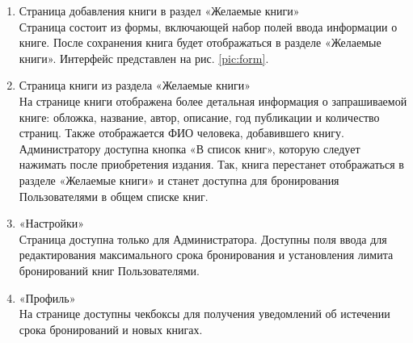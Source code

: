 \documentclass[project.tex]{subfiles}
\begin{document}
\begin{enumerate}
    \item Страница добавления книги в раздел «Желаемые книги»\\
    Страница состоит из формы, включающей набор полей ввода информации о книге. После сохранения книга будет отображаться в разделе «Желаемые книги». Интерфейс представлен на рис. \ref{pic:form}.
    \item Страница книги из раздела «Желаемые книги»\\
    На странице книги отображена более детальная информация о запрашиваемой книге: обложка, название, автор, описание, год публикации и количество страниц. Также отображается ФИО человека, добавившего книгу. Администратору доступна кнопка «В список книг», которую следует нажимать после приобретения издания. Так, книга перестанет отображаться в разделе «Желаемые книги» и станет доступна для бронирования Пользователями в общем списке книг.
    \item «Настройки»\\
    Страница доступна только для Администратора. Доступны поля ввода для редактирования максимального срока бронирования и установления лимита бронирований книг Пользователями.
    \item «Профиль»\\
    На странице доступны чекбоксы для получения уведомлений об истечении срока бронирований и новых книгах.
\end{enumerate}
\end{document}

